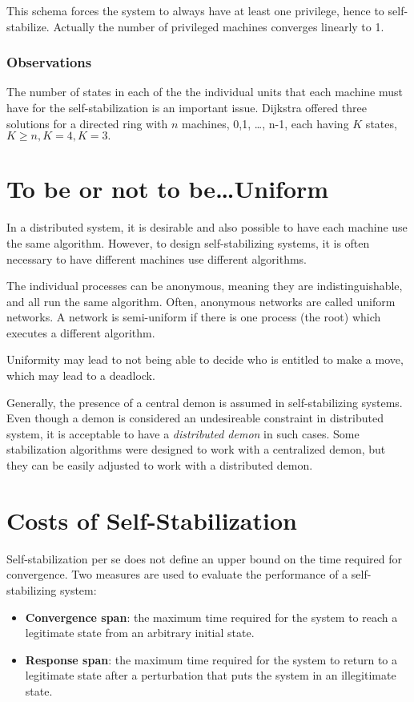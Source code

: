 This schema forces the system to always have at least one privilege, hence to self-stabilize.
Actually the number of privileged machines converges linearly to 1.


\subsubsection{Observations}

The number of states in each of the the individual units that each machine must have for the self-stabilization is an important issue. Dijkstra offered three solutions for a directed ring with $n$ machines, 0,1, \dots, n-1, each having $K$ states, $K \geq n, K=4, K=3.$


\section{To be or not to be\dots Uniform}
In a distributed system, it is desirable and also possible to have each machine use the same algorithm.
However, to design self-stabilizing systems, it is often necessary to have different machines use different algorithms.


The individual processes can be anonymous, meaning they are indistinguishable, and all run the
same algorithm.
Often, anonymous networks are called uniform networks.
A network is semi-uniform if there is one process (the root) which executes a different algorithm.


Uniformity may lead to not being able to decide who is entitled to make a move, which may lead to a deadlock.
\nl

Generally, the presence of a central demon is assumed in self-stabilizing systems.
Even though a demon is considered an undesireable constraint in distributed system, it is acceptable to have a \textit{distributed demon} in such cases.
Some stabilization algorithms were designed to work with a centralized demon, but they can be easily adjusted to work with a distributed demon.


\section{Costs of Self-Stabilization}
Self-stabilization per se does not define an upper bound on the time required for convergence.
Two measures are used to evaluate the performance of a self-stabilizing system:
\begin{itemize}
   \item \textbf{Convergence span}: the maximum time required for the system to reach a legitimate state from an arbitrary initial state.
   \item \textbf{Response span}: the maximum time required for the system to return to a legitimate state after a perturbation that puts the system in an illegitimate state.
\end{itemize}

